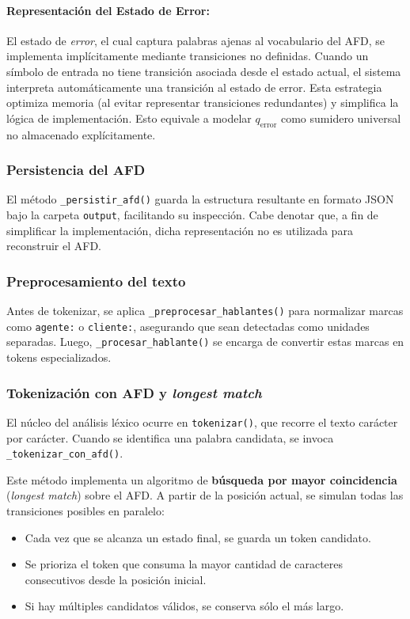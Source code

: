 \paragraph{\footnotesize{Representación del Estado de Error:}}
El estado de \textit{error}, el cual captura palabras ajenas al vocabulario del AFD, se
implementa implícitamente mediante transiciones no definidas. Cuando un símbolo de entrada no
tiene transición asociada desde el estado actual, el sistema interpreta automáticamente una
transición al estado de error. Esta estrategia optimiza memoria (al evitar representar
transiciones redundantes) y simplifica la lógica de implementación. Esto equivale a modelar
$q_{\text{error}}$ como sumidero universal no almacenado explícitamente.

\subsubsection{Persistencia del AFD}
El método \texttt{\_persistir\_afd()} guarda la estructura resultante en formato JSON bajo la
carpeta \texttt{output}, facilitando su inspección. Cabe denotar que, a fin de simplificar la
implementación, dicha representación no es utilizada para reconstruir el AFD.

\subsubsection{Preprocesamiento del texto}
Antes de tokenizar, se aplica \texttt{\_preprocesar\_hablantes()} para normalizar marcas como
\texttt{agente:} o \texttt{cliente:}, asegurando que sean detectadas como unidades separadas.
Luego, \texttt{\_procesar\_hablante()} se encarga de convertir estas marcas en tokens
especializados.

\subsubsection{Tokenización con AFD y \textit{longest match}}
El núcleo del análisis léxico ocurre en \texttt{tokenizar()}, que recorre el texto carácter por
carácter. Cuando se identifica una palabra candidata, se invoca
\texttt{\_tokenizar\_con\_afd()}.

Este método implementa un algoritmo de \textbf{búsqueda por mayor coincidencia}
(\textit{longest match}) sobre el AFD. A partir de la posición actual, se simulan todas las
transiciones posibles en paralelo:

\begin{itemize}
	\item Cada vez que se alcanza un estado final, se guarda un token candidato.
	\item Se prioriza el token que consuma la mayor cantidad de caracteres consecutivos desde la posición inicial.
	\item Si hay múltiples candidatos válidos, se conserva sólo el más largo.
\end{itemize}


